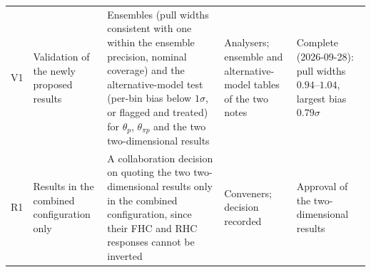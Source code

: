 {\begin{longtable}{@{}p{0.6cm}p{2.5cm}p{5.9cm}p{2.8cm}p{2.4cm}@{}}
\midrule
V1 & Validation of the newly proposed results &
  Ensembles (pull widths consistent with one within the ensemble precision, nominal coverage) and the
  alternative-model test (per-bin bias below $1\sigma$, or flagged and treated) for $\theta_p$,
  $\theta_{\pi p}$ and the two two-dimensional results &
  Analysers; ensemble and alternative-model tables of the two notes & Complete (2026-09-28): pull
  widths $0.94$--$1.04$, largest bias $0.79\sigma$ \\
R1 & Results in the combined configuration only &
  A collaboration decision on quoting the two two-dimensional results only in the combined
  configuration, since their FHC and RHC responses cannot be inverted &
  Conveners; decision recorded & Approval of the two-dimensional results \\
\end{longtable}}
